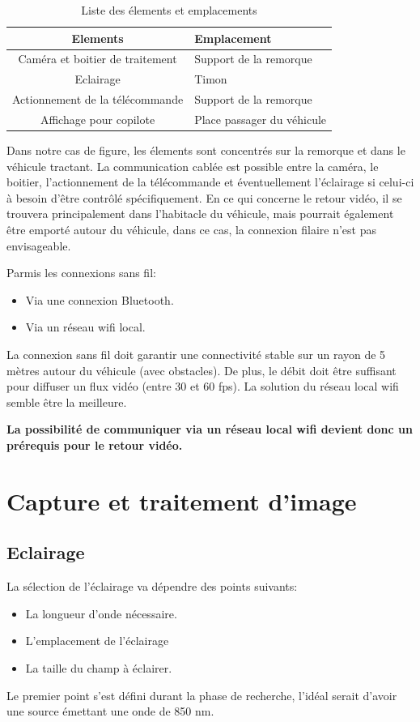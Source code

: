 \begin{table}[h]
    \begin{center}
        \caption{Liste des élements et emplacements}
        \begin{tabular}{|c|l|}
            Elements                        & Emplacement                \\ \hline
            Caméra et boitier de traitement & Support de la remorque     \\
            Eclairage                       & Timon                      \\
            Actionnement de la télécommande & Support de la remorque     \\
            Affichage pour copilote         & Place passager du véhicule
        \end{tabular}
    \end{center}
\end{table}

Dans notre cas de figure, les élements sont concentrés sur la remorque et dans le véhicule tractant. La communication cablée est possible
entre la caméra, le boitier, l'actionnement de la télécommande et éventuellement l'éclairage si celui-ci à besoin d'être contrôlé spécifiquement.
En ce qui concerne le retour vidéo, il se trouvera principalement dans l'habitacle du véhicule, mais pourrait également être emporté autour du véhicule,
dans ce cas, la connexion filaire n'est pas envisageable.

Parmis les connexions sans fil:
\begin{itemize}
    \item Via une connexion Bluetooth.
    \item Via un réseau \Gls{wifi} local.
\end{itemize}
La connexion sans fil doit garantir une connectivité stable sur un rayon de 5 mètres autour du véhicule (avec obstacles). De plus, le débit doit être
suffisant pour diffuser un flux vidéo (entre 30 et 60 \Gls{fps}). La solution du réseau local \Gls{wifi} semble être la meilleure.

\textbf{La possibilité de communiquer via un réseau local \Gls{wifi} devient donc un prérequis pour le retour vidéo.}
\newpage
\section{Capture et traitement d'image}
\subsection{Eclairage}
La sélection de l'éclairage va dépendre des points suivants:
\begin{itemize}
    \item La longueur d'onde nécessaire.
    \item L'emplacement de l'éclairage
    \item La taille du champ à éclairer.
\end{itemize}
Le premier point s'est défini durant la phase de recherche, l'idéal serait d'avoir une source émettant une onde de 850 \si{\nano\metre}.

